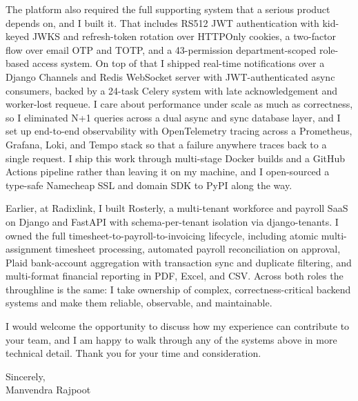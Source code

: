 \documentclass[11pt,a4paper]{article}
\begin{document}
The platform also required the full supporting system that a serious product depends
on, and I built it. That includes RS512 JWT authentication with kid-keyed JWKS and
refresh-token rotation over HTTPOnly cookies, a two-factor flow over email OTP and TOTP,
and a 43-permission department-scoped role-based access system. On top of that I shipped
real-time notifications over a Django Channels and Redis WebSocket server with
JWT-authenticated async consumers, backed by a 24-task Celery system with late
acknowledgement and worker-lost requeue. I care about performance under scale as much as
correctness, so I eliminated N+1 queries across a dual async and sync database layer, and
I set up end-to-end observability with OpenTelemetry tracing across a Prometheus,
Grafana, Loki, and Tempo stack so that a failure anywhere traces back to a single
request. I ship this work through multi-stage Docker builds and a GitHub Actions pipeline
rather than leaving it on my machine, and I open-sourced a type-safe Namecheap SSL and
domain SDK to PyPI along the way.

Earlier, at Radixlink, I built Rosterly, a multi-tenant workforce and payroll SaaS on
Django and FastAPI with schema-per-tenant isolation via django-tenants. I owned the full
timesheet-to-payroll-to-invoicing lifecycle, including atomic multi-assignment timesheet
processing, automated payroll reconciliation on approval, Plaid bank-account aggregation
with transaction sync and duplicate filtering, and multi-format financial reporting in
PDF, Excel, and CSV. Across both roles the throughline is the same: I take ownership of
complex, correctness-critical backend systems and make them reliable, observable, and
maintainable.

I would welcome the opportunity to discuss how my experience can contribute to your
team, and I am happy to walk through any of the systems above in more technical detail.
Thank you for your time and consideration.


Sincerely,\\[6pt]
Manvendra Rajpoot
\end{document}
